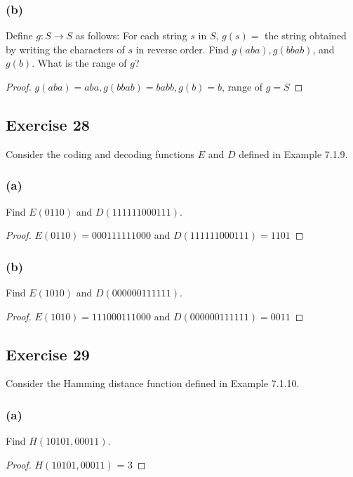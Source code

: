 \documentclass[14pt]{extarticle}
\begin{document}
\subsubsection{(b)}
Define \(g: S \to S\) as follows: For each string $s$ in $S$, \(g(s) =\) the string obtained by writing the
characters of $s$ in reverse order. Find \(g(aba), g(bbab)\), and \(g(b)\). What is the range of $g$?

\begin{proof}
    \(g(aba) = aba, g(bbab) = babb, g(b) = b\), range of \(g = S\)
\end{proof}

\subsection{Exercise 28}
Consider the coding and decoding functions $E$ and $D$ defined in Example 7.1.9.

\subsubsection{(a)}
Find \(E(0110)\) and \(D(111111000111)\).

\begin{proof}
    \(E(0110) = 000111111000\) and \(D(111111000111) = 1101\)
\end{proof}

\subsubsection{(b)}
Find \(E(1010)\) and \(D(000000111111)\).

\begin{proof}
    \(E(1010) = 111000111000\) and \(D(000000111111) = 0011\)
\end{proof}

\subsection{Exercise 29}
Consider the Hamming distance function defined in Example 7.1.10.

\subsubsection{(a)}
Find \(H(10101, 00011)\).

\begin{proof}
    \(H(10101, 00011)\) = 3
\end{proof}
\end{document}
